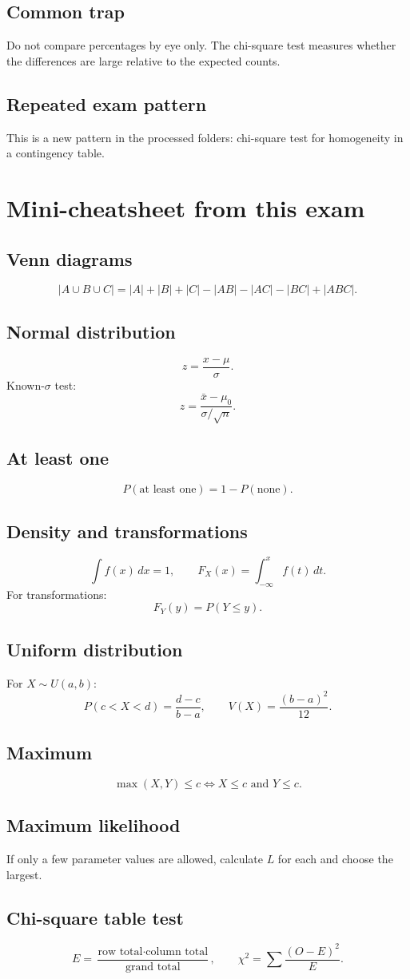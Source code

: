 \documentclass[11pt,a4paper]{article}
\begin{document}
\subsection*{Common trap}
Do not compare percentages by eye only. The chi-square test measures whether the differences are large relative to the expected counts.

\subsection*{Repeated exam pattern}
This is a new pattern in the processed folders: chi-square test for homogeneity in a contingency table.

\section*{Mini-cheatsheet from this exam}

\subsection*{Venn diagrams}
\[
|A\cup B\cup C|=|A|+|B|+|C|-|AB|-|AC|-|BC|+|ABC|.
\]

\subsection*{Normal distribution}
\[
z=\frac{x-\mu}{\sigma}.
\]
Known-\(\sigma\) test:
\[
z=\frac{\bar{x}-\mu_0}{\sigma/\sqrt{n}}.
\]

\subsection*{At least one}
\[
P(\text{at least one})=1-P(\text{none}).
\]

\subsection*{Density and transformations}
\[
\int f(x)\,dx=1,\qquad F_X(x)=\int_{-\infty}^{x}f(t)\,dt.
\]
For transformations:
\[
F_Y(y)=P(Y\le y).
\]

\subsection*{Uniform distribution}
For \(X\sim U(a,b)\):
\[
P(c<X<d)=\frac{d-c}{b-a},\qquad V(X)=\frac{(b-a)^2}{12}.
\]

\subsection*{Maximum}
\[
\max(X,Y)\le c \iff X\le c \text{ and } Y\le c.
\]

\subsection*{Maximum likelihood}
If only a few parameter values are allowed, calculate \(L\) for each and choose the largest.

\subsection*{Chi-square table test}
\[
E=\frac{\text{row total}\cdot \text{column total}}{\text{grand total}},
\qquad
\chi^2=\sum\frac{(O-E)^2}{E}.
\]
\end{document}
